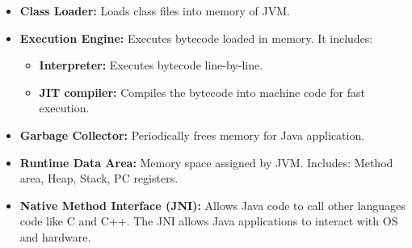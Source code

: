 \begin{flushleft}
	
	\begin{itemize}
		\item \textbf{Class Loader:} Loads class files into memory of JVM.
		\item \textbf{Execution Engine:} Executes bytecode loaded in memory. It includes:
		\begin{itemize}
			\item \textbf{Interpreter:} Executes bytecode line-by-line. 
			\item \textbf{JIT compiler:} Compiles the bytecode into machine code for fast execution.
		\end{itemize}
		\item \textbf{Garbage Collector:} Periodically frees memory for Java application.
		\item \textbf{Runtime Data Area:} Memory space assigned by JVM. Includes: Method area, Heap, Stack, PC registers.
		\item \textbf{Native Method Interface (JNI):} Allows Java code to call other languages code like C and C++. The JNI allows Java applications to interact with OS and hardware.	
	\end{itemize}
	
\end{flushleft}

\newpage